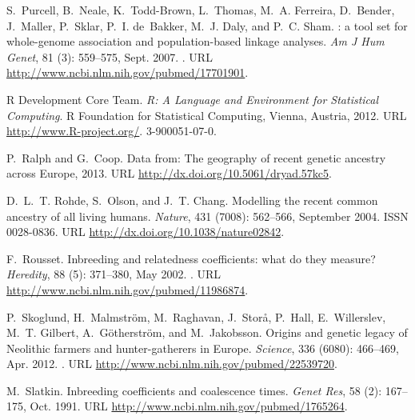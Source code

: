 \documentclass{article}
\begin{document}
\begin{thebibliography}{76}
S.~Purcell, B.~Neale, K.~Todd-Brown, L.~Thomas, M.~A. Ferreira, D.~Bender,
  J.~Maller, P.~Sklar, P.~I. de~Bakker, M.~J. Daly, and P.~C. Sham.
: a tool set for whole-genome association and population-based
  linkage analyses.
\newblock \emph{Am J Hum Genet}, 81 (3): 559--575, Sept.
  2007.
\newblock {}.
\newblock URL \url{http://www.ncbi.nlm.nih.gov/pubmed/17701901}.

{R Development Core Team}.
\newblock \emph{R: A Language and Environment for Statistical Computing}.
\newblock R Foundation for Statistical Computing, Vienna, Austria, 2012.
\newblock URL \url{http://www.R-project.org/}.
 3-900051-07-0.

P.~Ralph and G.~Coop.
\newblock Data from: {The} geography of recent genetic ancestry across
  {Europe}, 2013.
\newblock URL \url{http://dx.doi.org/10.5061/dryad.57kc5}.

D.~L.~T. Rohde, S.~Olson, and J.~T. Chang.
\newblock Modelling the recent common ancestry of all living humans.
\newblock \emph{Nature}, 431 (7008): 562--566, September
  2004.
\newblock ISSN 0028-0836.
\newblock URL \url{http://dx.doi.org/10.1038/nature02842}.

F.~Rousset.
\newblock Inbreeding and relatedness coefficients: what do they measure?
\newblock \emph{Heredity}, 88 (5): 371--380, May 2002.
\newblock {}.
\newblock URL \url{http://www.ncbi.nlm.nih.gov/pubmed/11986874}.

P.~Skoglund, H.~Malmstr{\"o}m, M.~Raghavan, J.~Stor{\aa}, P.~Hall,
  E.~Willerslev, M.~T. Gilbert, A.~G{\"o}therstr{\"o}m, and M.~Jakobsson.
\newblock Origins and genetic legacy of {Neolithic} farmers and
  hunter-gatherers in {Europe}.
\newblock \emph{Science}, 336 (6080): 466--469, Apr. 2012.
\newblock {}.
\newblock URL \url{http://www.ncbi.nlm.nih.gov/pubmed/22539720}.

M.~Slatkin.
\newblock Inbreeding coefficients and coalescence times.
\newblock \emph{Genet Res}, 58 (2): 167--175, Oct. 1991.
\newblock URL \url{http://www.ncbi.nlm.nih.gov/pubmed/1765264}.


\end{thebibliography}
\end{document}
